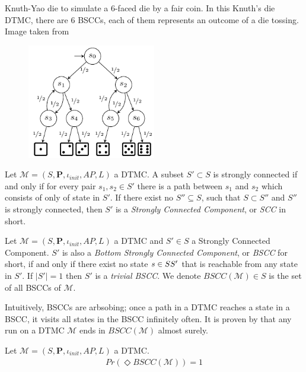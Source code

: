 \begin{example}
      Knuth-Yao die to simulate a 6-faced die by a fair coin. In this Knuth's die DTMC, there are 6
      BSCCs, each of them represents an outcome of a die tossing. Image taken from
      \cite{katoen2016probabilistic}
      \begin{figure}[H]
            \centering
            \includegraphics[width=0.5\textwidth]{figures/knuth_die.png}
            \label{fig:knuth-die}
      \end{figure}
\end{example}

\begin{definition}
      Let $\mathcal{M}=(S,\mathbf{P}, \iota_{init}, AP,L)$ a DTMC. A subset $S'\subset S$ is strongly
      connected if and only if for every pair $s_1,s_2\in S'$ there is a path between $s_1$ and $s_2$
      which consists of only of state in $S'$. If there exist no $S''\subseteq S$, such that $S\subset
            S''$ and $S''$ is strongly connected, then $S'$ is a \textit{Strongly Connected Component}, or
      \textit{SCC} in short.
\end{definition}

\begin{definition}
      Let $\mathcal{M}=(S,\mathbf{P}, \iota_{init}, AP,L)$ a DTMC and $S'\in S$ a Strongly Connected
      Component. $S'$ is also a \textit{Bottom Strongly Connected Component}, or \textit{BSCC} for
      short, if and only if there exist no state $s \in S\\S'$ that is reachable from any state in
      $S'$. If $|S'|=1$ then $S'$ is a \textit{trivial BSCC}. We denote $BSCC(\mathcal{M})\in S$ is
      the set of all BSCCs of $\mathcal{M}$.
\end{definition}
Intuitively, BSCCs are arbsobing; once a path in a DTMC reaches a state in a BSCC, it visits  all
states in the BSCC infinitely often. It is proven by \cite{baier2008principles} that any run on a
DTMC $\mathcal{M}$ ends in $BSCC(\mathcal{M})$ almost surely.
\begin{theorem}
      Let $\mathcal{M}=(S,\mathbf{P}, \iota_{init}, AP,L)$ a DTMC.
      \begin{align*}
            Pr(\Diamond BSCC(\mathcal{M})) = 1
      \end{align*}
\end{theorem}

